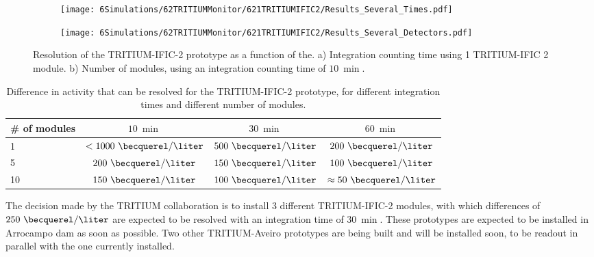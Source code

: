 \begin{figure}
\centering
    \begin{subfigure}[b]{0.75\textwidth}
    \centering
    \texttt{[image: 6Simulations/62TRITIUMMonitor/621TRITIUMIFIC2/Results\_Several\_Times.pdf]}  
    \caption{\label{subfig:ResolutionvsIntegrationCoutingTime}}
    \end{subfigure}
    \hfill
    \begin{subfigure}[b]{0.75\textwidth}
    \centering
    \texttt{[image: 6Simulations/62TRITIUMMonitor/621TRITIUMIFIC2/Results\_Several\_Detectors.pdf]}  
    \caption{\label{subfig:ResolutionvsNumberDetectors}}
    \end{subfigure}
 \caption{Resolution of the TRITIUM-IFIC-2 prototype as a function of the. a) Integration counting time using 1 TRITIUM-IFIC 2 module. b) Number of modules, using an integration counting time of $10~\min$.}
 \label{fig:Resolution}
\end{figure}

\begin{table}[htbp]
\centering{}%
\begin{tabular}{lccc}
\toprule 
\# of modules & $10~\min$ & $30~\min$ & $60~\min$ \tabularnewline
\midrule
\midrule 
1 & $<1000~\becquerel/\liter$ & $500~\becquerel/\liter$ & $200~\becquerel/\liter$ \tabularnewline
5 & $200~\becquerel/\liter$ & $150~\becquerel/\liter$ & $100~\becquerel/\liter$ \tabularnewline
10 & $150~\becquerel/\liter$ & $100~\becquerel/\liter$ & $\approx 50~\becquerel/\liter$ \tabularnewline
\bottomrule
\end{tabular}
\caption{Difference in activity that can be resolved for the TRITIUM-IFIC-2 prototype, for different integration times and different number of modules.}
\label{tab:DifferentCasesOfTI2}
\end{table}

The decision made by the TRITIUM collaboration is to install 3 different TRITIUM-IFIC-2 modules, with which differences of $250~\becquerel/\liter$ are expected to be resolved with an integration time of $30~\min$. These prototypes are expected to be installed  in Arrocampo dam as soon as possible. Two other TRITIUM-Aveiro prototypes are being built and will be installed soon, to be readout in parallel with the one currently installed.


